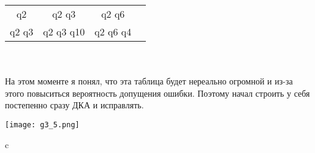 \documentclass{article}
\begin{document}
\begin{enumerate}
\begin{tabular}{|c|c|c|c|}
         q2             & q2 q3         & q2 q6         \\
         q2 q3          & q2 q3 q10     & q2 q6 q4      \\ 
         \hline
    \end{tabular} \\ \\
    На этом моменте я понял, что эта таблица будет нереально огромной и из-за этого повыситься вероятность допущения ошибки. Поэтому начал строить у себя постепенно сразу ДКА и исправлять.
    \\ 
    \begin{flushleft}
        \texttt{[image: g3\_5.png]}
    \end{flushleft}
\end{enumerate}c
\end{document}
